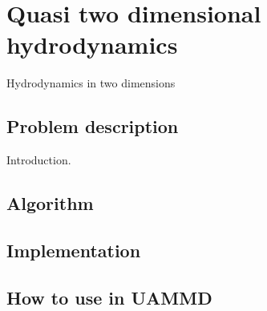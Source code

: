 \chapter{Quasi two dimensional hydrodynamics}\label{ch:physicsalgorithms}
Hydrodynamics in two dimensions
\section{Problem description}
Introduction.
\section{Algorithm}

\section{Implementation}

\section{How to use in UAMMD}


